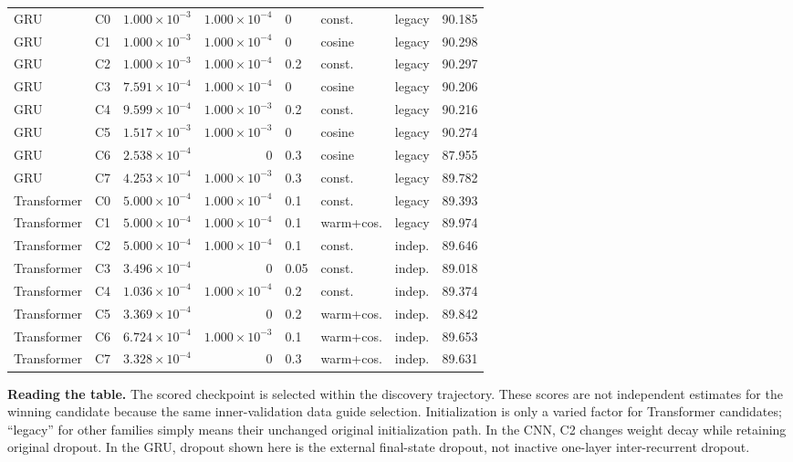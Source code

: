 \begin{center}
\begin{longtable}{llrrlllr}
GRU & C0 & $1.000\!\times\!10^{-3}$ & $1.000\!\times\!10^{-4}$ & 0 & const. & legacy & 90.185 \\
GRU & C1 & $1.000\!\times\!10^{-3}$ & $1.000\!\times\!10^{-4}$ & 0 & cosine & legacy & 90.298 \\
GRU & C2 & $1.000\!\times\!10^{-3}$ & $1.000\!\times\!10^{-4}$ & 0.2 & const. & legacy & 90.297 \\
GRU & C3 & $7.591\!\times\!10^{-4}$ & $1.000\!\times\!10^{-4}$ & 0 & cosine & legacy & 90.206 \\
GRU & C4 & $9.599\!\times\!10^{-4}$ & $1.000\!\times\!10^{-3}$ & 0.2 & const. & legacy & 90.216 \\
GRU & C5 & $1.517\!\times\!10^{-3}$ & $1.000\!\times\!10^{-3}$ & 0 & cosine & legacy & 90.274 \\
GRU & C6 & $2.538\!\times\!10^{-4}$ & $0$ & 0.3 & cosine & legacy & 87.955 \\
GRU & C7 & $4.253\!\times\!10^{-4}$ & $1.000\!\times\!10^{-3}$ & 0.3 & const. & legacy & 89.782 \\
Transformer & C0 & $5.000\!\times\!10^{-4}$ & $1.000\!\times\!10^{-4}$ & 0.1 & const. & legacy & 89.393 \\
Transformer & C1 & $5.000\!\times\!10^{-4}$ & $1.000\!\times\!10^{-4}$ & 0.1 & warm+cos. & legacy & 89.974 \\
Transformer & C2 & $5.000\!\times\!10^{-4}$ & $1.000\!\times\!10^{-4}$ & 0.1 & const. & indep. & 89.646 \\
Transformer & C3 & $3.496\!\times\!10^{-4}$ & $0$ & 0.05 & const. & indep. & 89.018 \\
Transformer & C4 & $1.036\!\times\!10^{-4}$ & $1.000\!\times\!10^{-4}$ & 0.2 & const. & indep. & 89.374 \\
Transformer & C5 & $3.369\!\times\!10^{-4}$ & $0$ & 0.2 & warm+cos. & indep. & 89.842 \\
Transformer & C6 & $6.724\!\times\!10^{-4}$ & $1.000\!\times\!10^{-3}$ & 0.1 & warm+cos. & indep. & 89.653 \\
Transformer & C7 & $3.328\!\times\!10^{-4}$ & $0$ & 0.3 & warm+cos. & indep. & 89.631 \\
\bottomrule
\end{longtable}\end{center}
\textbf{Reading the table.} The scored checkpoint is selected within the discovery trajectory. These scores are not independent estimates for the winning candidate because the same inner-validation data guide selection. Initialization is only a varied factor for Transformer candidates; ``legacy'' for other families simply means their unchanged original initialization path. In the CNN, C2 changes weight decay while retaining original dropout. In the GRU, dropout shown here is the external final-state dropout, not inactive one-layer inter-recurrent dropout.

